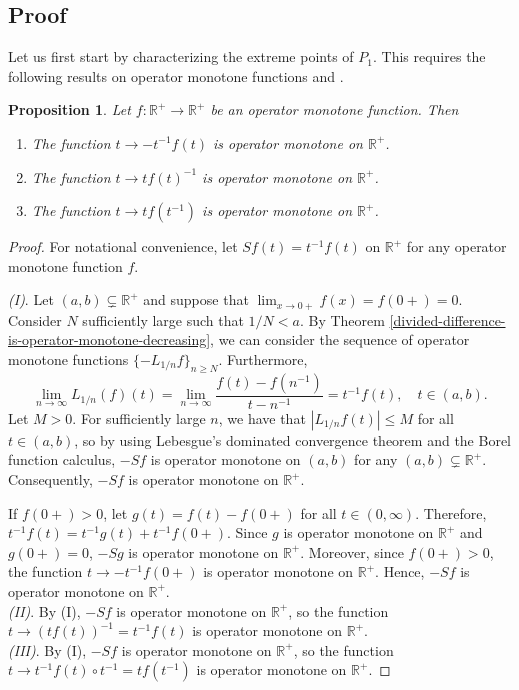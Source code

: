 \documentclass[12pt,a4paper]{amsart}
\newtheorem{proposition}[theorem]{Proposition}
\theoremstyle{definition}
\newcommand{\myabs}[1]{ | #1 | }
\begin{document}
	\subsection{Proof}
	Let us first start by characterizing the extreme points of $P_1$. This requires the following results on operator monotone functions \cite[Theorem 10.10]{barry-simon} and \cite[Corollary 4.2]{hansen-fasttrack}.
	\begin{proposition}\label{several-operator-monotone-functions}
		Let $f: \mathbb{R}^{+} \rightarrow \mathbb{R}^{+}$ be an operator monotone function. Then
		\begin{enumerate}[label=\textnormal{(\Roman*)}]
			\item The function $t \rightarrow -t^{-1}f(t)$ is operator monotone on $\mathbb{R}^{+}$.
			\item The function $t \rightarrow t f(t)^{-1}$ is operator monotone on $\mathbb{R}^{+}$.
			\item The function $t \rightarrow t f(t^{-1})$ is operator monotone on $\mathbb{R}^{+}$.
		\end{enumerate}
	\end{proposition}
	\begin{proof}
		For notational convenience, let $Sf(t) = t^{-1}f(t)$  on $\mathbb{R}^{+}$ for any operator monotone function $f$.
		\par 
		\emph{\textnormal{(I)}}. Let $ (a, b) \subsetneq \mathbb{R}^{+}$ and suppose that $\displaystyle \lim_{x \rightarrow 0+}f(x) = f(0+)=  0$.  Consider  $N$ sufficiently large such that $1/N < a$. By Theorem \ref{divided-difference-is-operator-monotone-decreasing}, we can consider the sequence of operator monotone functions $\lbrace -L_{1/n}f \rbrace_{n \geq N}$. Furthermore,
		\[  \lim_{n \rightarrow \infty} L_{1/n}(f)(t) = \lim_{n \rightarrow \infty}  \frac{f(t) - f(n^{-1})}{t - n^{-1}} = t^{-1} f(t), \quad t \in (a, b). \]
		Let $M > 0$. For sufficiently large $n$, we have that $\myabs{L_{1/n}f(t)} \leq M$  for all $t \in (a, b)$, so by using Lebesgue's dominated convergence theorem and the Borel function calculus, $-Sf$ is operator monotone on $(a,b)$ for any $ (a, b) \subsetneq \mathbb{R}^{+}$. Consequently, $-Sf$ is operator monotone on $\mathbb{R}^{+}$.
		\par
		If $f(0+)> 0$, let $g(t) = f(t) - f(0+)$ for all $t \in (0, \infty)$. Therefore, $t^{-1}f(t) = t^{-1}g(t) + t^{-1}f(0+)$. Since $g$ is operator monotone on $\mathbb{R}^{+}$ and $g(0+)=0$, $-Sg$ is operator monotone on $\mathbb{R}^{+}$. Moreover, since $f(0+) > 0$, the function $ t \rightarrow -t^{-1}f(0+)$ is operator monotone on $\mathbb{R}^{+}$. Hence, $-Sf$ is operator monotone on $\mathbb{R}^{+}$.  \\
		\emph{\textnormal{(II)}}. By (I), $-Sf$ is operator monotone on $\mathbb{R}^{+}$, so the function $t \rightarrow (tf(t))^{-1} = t^{-1} f(t)$ is operator monotone on $\mathbb{R}^{+}$. \\
		\emph{\textnormal{(III)}}. By (I), $-Sf$ is operator monotone on $\mathbb{R}^{+}$, so the function $t \rightarrow t^{-1}f(t) \circ t^{-1} = t f(t^{-1})$ is operator monotone on $\mathbb{R}^{+}$.
	\end{proof}
	
\end{document}

